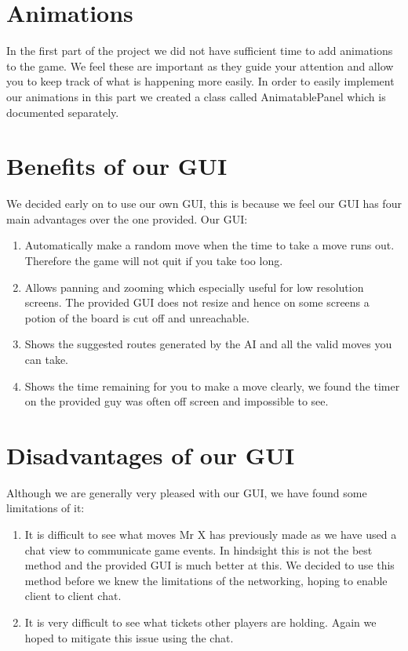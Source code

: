 \documentclass[a4paper, 12pt]{article}
\begin{document}
\section{Animations}
In the first part of the project we did not have sufficient time to add animations to the game. We feel these are important as they guide your attention and allow you to keep track of what is happening more easily. In order to easily implement our animations in this part we created a class called AnimatablePanel which is documented separately.
\section{Benefits of our GUI}
We decided early on to use our own GUI, this is because we feel our GUI has four main advantages over the one provided. Our GUI:
\begin{enumerate}
	\item Automatically make a random move when the time to take a move runs out. Therefore the game will not quit if you take too long.
	\item Allows panning and zooming which especially useful for low resolution screens. The provided GUI does not resize and hence on some screens a potion of the board is cut off and unreachable.
	\item Shows the suggested routes generated by the AI and all the valid moves you can take.
	\item Shows the time remaining for you to make a move clearly, we found the timer on the provided guy was often off screen and impossible to see.
\end{enumerate}
\section{Disadvantages of our GUI}
Although we are generally very pleased with our GUI, we have found some limitations of it:
\begin{enumerate}
	\item It is difficult to see what moves Mr X has previously made as we have used a chat view to communicate game events. In hindsight this is not the best method and the provided GUI is much better at this. We decided to use this method before we knew the limitations of the networking, hoping to enable client to client chat.
	\item It is very difficult to see what tickets other players are holding. Again we hoped to mitigate this issue using the chat.
\end{enumerate}
\end{document}
